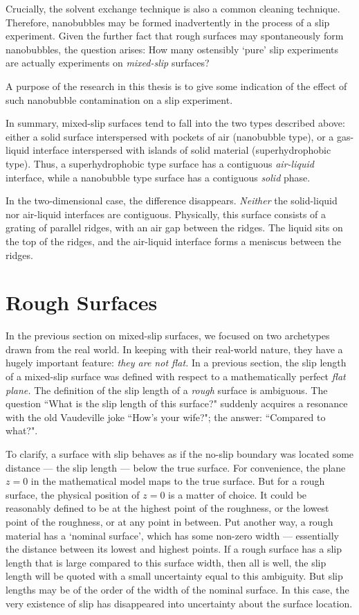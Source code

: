 \documentclass[a4paper]{report}
\begin{document}
Crucially, the solvent exchange technique is also a common cleaning technique.  Therefore, nanobubbles may be formed inadvertently in the process of a slip experiment.  Given the further fact that rough surfaces may spontaneously form nanobubbles, the question arises:  How many ostensibly `pure' slip experiments are actually experiments on \emph{mixed-slip} surfaces?

A purpose of the research in this thesis is to give some indication of the effect of such nanobubble contamination on a slip experiment.

\vspace*{1em}
In summary, mixed-slip surfaces tend to fall into the two types described above: either a solid surface interspersed with pockets of air (nanobubble type), or a gas-liquid interface interspersed with islands of solid material (superhydrophobic type).  Thus, a superhydrophobic type surface has a contiguous \emph{air-liquid} interface, while a nanobubble type surface has a contiguous \emph{solid} phase.

In the two-dimensional case, the difference disappears.  \emph{Neither} the solid-liquid nor air-liquid interfaces are contiguous.  Physically, this surface consists of a grating of parallel ridges, with an air gap between the ridges.  The liquid sits on the top of the ridges, and the air-liquid interface forms a meniscus between the ridges.


\section{Rough Surfaces}

In the previous section on mixed-slip surfaces, we focused on two archetypes drawn from the real world.  In keeping with their real-world nature, they have a hugely important feature: \emph{they are not flat.}  In a previous section, the slip length of a mixed-slip surface was defined with respect to a mathematically perfect \emph{flat plane.}  The definition of the slip length of a \emph{rough} surface is ambiguous.  The question ``What is the slip length of this surface?" suddenly acquires a resonance with the old Vaudeville joke ``How's your wife?";  the answer: ``Compared to what?".

To clarify, a surface with slip behaves as if the no-slip boundary was located some distance --- the slip length --- below the true surface.  For convenience, the plane $z=0$ in the mathematical model maps to the true surface. But for a rough surface, the physical position of $z=0$ is a matter of choice.  It could be reasonably defined to be at the highest point of the roughness, or the lowest point of the roughness, or at any point in between.  Put another way, a rough material has a  `nominal surface', which has some non-zero width --- essentially the distance between its lowest and highest points.  If a rough surface has a slip length that is  large compared to this surface width, then all is well, the slip length will be quoted with a small uncertainty equal to this ambiguity.  But slip lengths may be of the order of the width of the nominal surface.  In this case, the very existence of slip has disappeared into uncertainty about the surface location.
\end{document}
